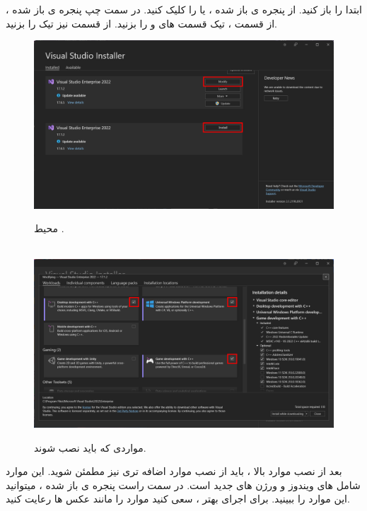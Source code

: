 {
    \Large
    ابتدا  را باز کنید. از پنجره ی باز شده ،  یا  را کلیک کنید. در سمت چپ پنجره ی باز شده ، از قسمت  ، تیک قسمت های  و  را بزنید.
    از قسمت  نیز تیک  را بزنید.

    \begin{figure}[H]
        \centering
        \setlength{\belowcaptionskip}{-10pt}
        \includegraphics[width=\textwidth]{Images/1.Intro.2.1.png}
        \caption{محیط .}
        \\[20pt]
        \includegraphics[width=\textwidth]{Images/1.Intro.2.2.png}
        \caption{مواردی که باید نصب شوند.}
    \end{figure}

    بعد از نصب موارد بالا ، باید از نصب موارد اضافه تری نیز مطمئن شوید. این موارد شامل  های ویندوز و ورژن های جدید  است.
    در سمت راست پنجره ی باز شده ، میتوانید این موارد را ببینید. برای اجرای بهتر ، سعی کنید موارد را مانند عکس ها رعایت کنید.

}
